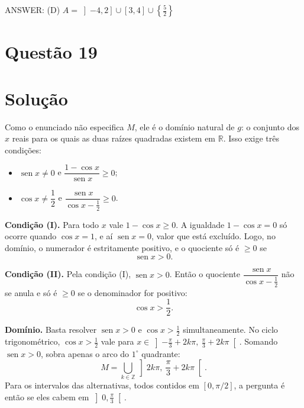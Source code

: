 \documentclass{article}%
\begin{document}
ANSWER: (D) $A=\left]-4,2\right]\cup\left[3,4\right]\cup\left\{\tfrac{5}{2}\right\}$%
\newpage%
\section*{Questão 19}

\section*{Solução}

Como o enunciado não especifica $M$, ele é o domínio natural de $g$: o conjunto dos $x$ reais para os quais as duas raízes quadradas existem em $\mathbb{R}$. Isso exige três condições:
\begin{itemize}
\item[(I)] $\operatorname{sen} x \neq 0$ e $\dfrac{1-\cos x}{\operatorname{sen} x}\ge 0$;
\item[(II)] $\cos x \neq \dfrac12$ e $\dfrac{\operatorname{sen} x}{\cos x-\frac12}\ge 0$.
\end{itemize}

\textbf{Condição (I).} Para todo $x$ vale $1-\cos x\ge 0$. A igualdade $1-\cos x=0$ só ocorre quando $\cos x=1$, e aí $\operatorname{sen} x=0$, valor que está excluído. Logo, no domínio, o numerador é estritamente positivo, e o quociente só é $\ge 0$ se
\[
\operatorname{sen} x>0 .
\]

\textbf{Condição (II).} Pela condição (I), $\operatorname{sen} x>0$. Então o quociente $\dfrac{\operatorname{sen} x}{\cos x-\frac12}$ não se anula e só é $\ge 0$ se o denominador for positivo:
\[
\cos x>\frac12 .
\]

\textbf{Domínio.} Basta resolver $\operatorname{sen} x>0$ e $\cos x>\frac12$ simultaneamente. No ciclo trigonométrico, $\cos x>\frac12$ vale para $x\in\left]-\frac{\pi}{3}+2k\pi,\ \frac{\pi}{3}+2k\pi\right[$. Somando $\operatorname{sen} x>0$, sobra apenas o arco do $1^\circ$ quadrante:
\[
M=\bigcup_{k\in\mathbb{Z}}\left]2k\pi,\ \frac{\pi}{3}+2k\pi\right[ .
\]
Para os intervalos das alternativas, todos contidos em $[0,\pi/2]$, a pergunta é então se eles cabem em $\left]0,\frac{\pi}{3}\right[$.
\end{document}
